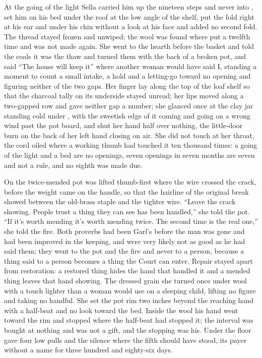 At the going of the light Sella carried him up the nineteen steps and never into , set him on his bed under the roof at the low angle of the shelf, put the fold right at his ear and under his chin without a look at his face and added no second fold. The thread stayed frozen and unwiped; the wool was found where put a twelfth time and was not made again. She went to the hearth before the basket and told the coals it was the thaw and turned them with the back of a broken pot, and said “The house will keep it” where another woman would have said I, standing a moment to count a small intake, a hold and a letting-go toward no opening and figuring neither of the two gaps. Her finger lay along the top of the loaf shelf so that the charcoal tally on its underside stayed unread; her lips moved along a two-gapped row and gave neither gap a number; she glanced once at the clay jar standing cold under , with the sweetish edge of it coming and going on a wrong wind past the pot board, and shut her hand half over nothing, the little-door burn on the back of her left hand closing on air. She did not touch  at her throat, the cord oiled where a working thumb had touched it ten thousand times: a going of the light and a bed are no openings, seven openings in seven months are seven and not a rule, and no eighth was made due.

On  the twice-mended pot was lifted thumb-first where the wire crossed the crack, before the weight came on the handle, so that the hairline of the original break showed between the old-brass staple and the tighter wire. “Leave the crack showing. People trust a thing they can see has been handled,” she told the pot. “If it's worth mending it's worth mending twice. The second time is the real one,” she told the fire. Both proverbs had been Garl's before the man was gone and had been improved in the keeping, and were very likely not as good as he had said them; they went to the pot and the fire and never to a person, because a thing said to a person becomes a thing the Court can enter. Repair stayed apart from restoration: a restored thing hides the hand that handled it and a mended thing leaves that hand showing. The dressed grain she turned once under wool with a touch lighter than a woman would use on a sleeping child, lifting no figure and taking no handful. She set the pot rim two inches beyond the reaching hand with a half-beat and no look toward the bed. Inside the wool his hand went toward the rim and stopped where the half-beat had stopped it; the interval was bought at nothing and was not a gift, and the stopping was his. Under the floor  gave four low pulls and the silence where the fifth should have stood, its payer without a name for three hundred and eighty-six days.


